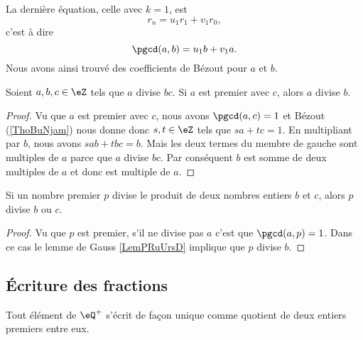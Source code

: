 La dernière équation, celle avec \( k=1\), est
\begin{equation}
    r_n=u_1r_1+v_1r_0,
\end{equation}
c'est à dire
\begin{equation}        \label{EqNDMLooDvaiAc}
    \pgcd(a,b)=u_1b+v_1a.
\end{equation}
Nous avons ainsi trouvé des coefficients de Bézout pour $a$ et $b$.

\begin{lemma}    \label{LemPRuUrsD}
    Soient \( a,b,c\in \eZ\) tels que \( a\) divise \( bc\). Si \( a\) est premier avec \( c\), alors \( a\) divise \( b\).
\end{lemma}

\begin{proof}
    Vu que \( a\) est premier avec \( c\), nous avons \( \pgcd(a,c)=1\) et Bézout (\ref{ThoBuNjam}) nous donne donc \( s,t\in \eZ\) tels que \( sa+tc=1\). En multipliant par \( b\), nous avons $sab+tbc=b$. Mais les deux termes du membre de gauche sont multiples de \( a\) parce que \( a\) divise \( bc\). Par conséquent \( b\) est somme de deux multiples de \( a\) et donc est multiple de \( a\).
\end{proof}

\begin{lemma}       \label{LemAXINooOeuMJZ}
    Si un nombre premier $p$ divise le produit de deux nombres entiers $b$ et $c$, alors $p$ divise $b$ ou $c$.
\end{lemma}

\begin{proof}
    Vu que \( p\) est premier, s'il ne divise pas \( a\) c'est que \( \pgcd(a,p)=1\). Dans ce cas le lemme de Gauss \ref{LemPRuUrsD} implique que \( p\) divise \( b\).
\end{proof}

\subsection{Écriture des fractions}

\begin{theorem}     \label{THOooWYQVooRBaAAM}
    Tout élément de \( \eQ^+\) s'écrit de façon unique comme quotient de deux entiers premiers entre eux.
\end{theorem}

